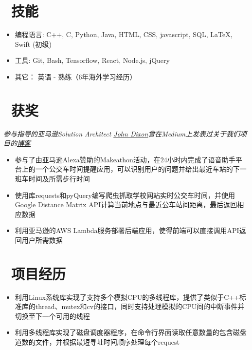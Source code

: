 \documentclass{resume}
\begin{document}

\section{\faCogs\ 技能}
\begin{itemize}[parsep=0.5ex]
  \item 编程语言: C++, C, Python, Java, HTML, CSS,  javascript, SQL, \LaTeX, Swift (初级)
  \item 工具: Git, Bash, Tensorflow, React, Node.js, jQuery
  \item 其它： 英语 - 熟练（6年海外学习经历）
\end{itemize}

\section{\faTrophy\ 获奖}
\begin{onehalfspacing}
\textit{参与指导的亚马逊Solution Architect \href{https://www.linkedin.com/in/jpd44/}{\underline{John Dixon}}曾在Medium上发表过关于我们项目的\href{https://medium.com/voice-tech-podcast/alexa-when-is-the-next-bus-620e1aba9474}{\underline{博客}}}
\begin{itemize}
	\item 参与了由亚马逊Alexa赞助的Makeathon活动，在24小时内完成了语音助手平台上的一个公交车时间提醒应用，可以识别用户的问题并给出最近车站的下一班车时间及所需步行时间
	\item 使用库requests和pyQuery编写爬虫抓取学校网站实时公交车时间，并使用Google Distance Matrix API计算当前地点与最近公车站间距离，最后返回相应数据
	\item 利用亚马逊的AWS Lambda服务部署后端应用，使得前端可以直接调用API返回用户所需数据
\end{itemize}
\end{onehalfspacing}

\section{\faWrench\ 项目经历}
\begin{onehalfspacing}
\begin{itemize}
	\item 利用Linux系统库实现了支持多个模拟CPU的多线程库，提供了类似于C++标准库的thread、mutex和cv的接口，同时支持处理模拟的CPU间的中断事件并切换至下一个可用的线程
	\item 利用多线程库实现了磁盘调度器程序，在命令行界面读取任意数量的包含磁盘道数的文件，并根据最短寻址时间顺序处理每个request
\end{itemize}
\end{onehalfspacing}
\end{document}
